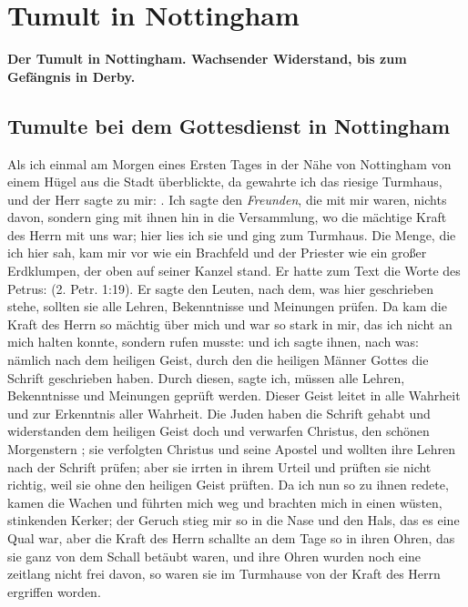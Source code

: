 \chapter[Tumult in Nottingham]{Tumult in Nottingham}

\begin{center}
\textbf{Der Tumult in Nottingham. Wachsender Widerstand, bis zum
Gefängnis in Derby.}
\end{center}

\section{Tumulte bei dem Gottesdienst in Nottingham}
Als  ich einmal am Morgen eines Ersten Tages in der Nähe
von Nottingham von einem Hügel aus die 
Stadt überblickte, da
gewahrte ich das riesige Turmhaus, und der Herr sagte zu mir:
. Ich sagte den \textit{Freunden},
die mit mir waren, nichts davon, sondern ging mit ihnen hin in
die Versammlung, wo die mächtige Kraft des Herrn mit uns
war; hier lies ich sie und ging zum Turmhaus. Die Menge,
die ich hier sah, kam mir vor wie ein Brachfeld und der Priester
wie ein großer Erdklumpen, der oben auf seiner Kanzel stand.
Er hatte zum Text die Worte des Petrus: 
(2. Petr. 1:19). 
Er sagte den Leuten, nach dem, was hier geschrieben 
stehe, sollten sie alle Lehren, Bekenntnisse und Meinungen
prüfen. Da kam die Kraft des Herrn so mächtig über mich und
war so stark in mir, das ich nicht an mich halten konnte, sondern
rufen musste: 
und ich sagte ihnen, nach was: nämlich nach dem heiligen Geist,
durch den die heiligen Männer Gottes die Schrift geschrieben
haben. Durch diesen, sagte ich, müssen alle Lehren, Bekenntnisse
und Meinungen geprüft werden. Dieser Geist leitet in alle
Wahrheit und zur Erkenntnis aller Wahrheit. Die 
Juden haben
die Schrift gehabt und widerstanden dem heiligen Geist doch und 
verwarfen Christus, den schönen Morgenstern ; sie verfolgten Christus
und seine Apostel und wollten ihre Lehren nach der Schrift prüfen;
aber sie irrten in ihrem Urteil und prüften sie nicht richtig, weil
sie ohne den heiligen Geist prüften. Da ich nun so zu ihnen
redete, kamen die Wachen und führten mich weg und brachten
mich in einen wüsten, stinkenden Kerker; der Geruch stieg mir so
in die Nase und den Hals, das es eine Qual war, aber die
Kraft des Herrn schallte an dem Tage so in ihren Ohren, das
sie ganz von dem Schall betäubt waren, und ihre Ohren wurden
noch eine zeitlang nicht frei davon, so waren sie im Turmhause
von der Kraft des Herrn ergriffen worden. 


